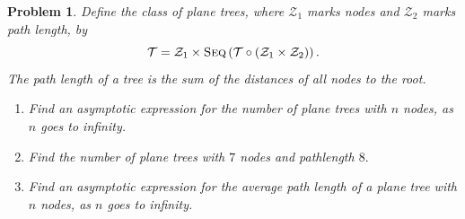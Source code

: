 \documentclass{article}
\theoremstyle{plain}
\newtheorem{prob}{Problem}
\begin{document}
\begin{prob}
  Define the class of plane trees, where \( \mathcal{Z}_1 \) marks
  nodes and \( \mathcal{Z}_2 \) marks path length, by
  \[
    \mathcal{T} = \mathcal{Z}_1 \times \textsc{Seq}\left( \mathcal{T} \circ
    ( \mathcal{Z}_1 \times \mathcal{Z}_2 ) \right).
  \]
  The path length of a tree is the sum of the distances of all
  nodes to the root.
  \begin{enumerate}
  \item Find an asymptotic expression for the number of plane trees with \( n \)
nodes, as \( n \) goes to infinity.
  \item Find the number of plane trees with \( 7 \) nodes and
    pathlength \( 8. \)
  \item Find an asymptotic expression for the average path length of a plane
  tree with \( n \) nodes, as \( n \) goes to infinity.
  \end{enumerate}
\end{prob}
\end{document}
